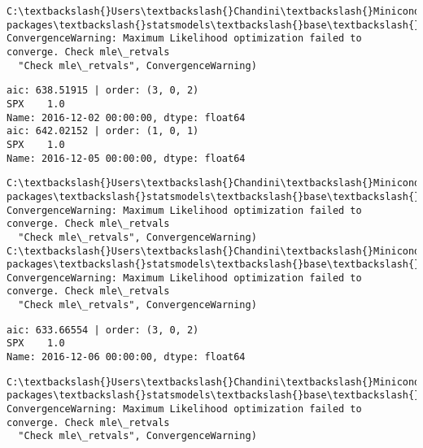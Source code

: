\documentclass[11pt]{article}
\begin{document}
    \begin{Verbatim}[commandchars=\\\{\}]
C:\textbackslash{}Users\textbackslash{}Chandini\textbackslash{}Miniconda3\textbackslash{}envs\textbackslash{}auquan\textbackslash{}lib\textbackslash{}site-packages\textbackslash{}statsmodels\textbackslash{}base\textbackslash{}model.py:496: ConvergenceWarning: Maximum Likelihood optimization failed to converge. Check mle\_retvals
  "Check mle\_retvals", ConvergenceWarning)

    \end{Verbatim}

    \begin{Verbatim}[commandchars=\\\{\}]
aic: 638.51915 | order: (3, 0, 2)
SPX    1.0
Name: 2016-12-02 00:00:00, dtype: float64
aic: 642.02152 | order: (1, 0, 1)
SPX    1.0
Name: 2016-12-05 00:00:00, dtype: float64

    \end{Verbatim}

    \begin{Verbatim}[commandchars=\\\{\}]
C:\textbackslash{}Users\textbackslash{}Chandini\textbackslash{}Miniconda3\textbackslash{}envs\textbackslash{}auquan\textbackslash{}lib\textbackslash{}site-packages\textbackslash{}statsmodels\textbackslash{}base\textbackslash{}model.py:496: ConvergenceWarning: Maximum Likelihood optimization failed to converge. Check mle\_retvals
  "Check mle\_retvals", ConvergenceWarning)
C:\textbackslash{}Users\textbackslash{}Chandini\textbackslash{}Miniconda3\textbackslash{}envs\textbackslash{}auquan\textbackslash{}lib\textbackslash{}site-packages\textbackslash{}statsmodels\textbackslash{}base\textbackslash{}model.py:496: ConvergenceWarning: Maximum Likelihood optimization failed to converge. Check mle\_retvals
  "Check mle\_retvals", ConvergenceWarning)

    \end{Verbatim}

    \begin{Verbatim}[commandchars=\\\{\}]
aic: 633.66554 | order: (3, 0, 2)
SPX    1.0
Name: 2016-12-06 00:00:00, dtype: float64

    \end{Verbatim}

    \begin{Verbatim}[commandchars=\\\{\}]
C:\textbackslash{}Users\textbackslash{}Chandini\textbackslash{}Miniconda3\textbackslash{}envs\textbackslash{}auquan\textbackslash{}lib\textbackslash{}site-packages\textbackslash{}statsmodels\textbackslash{}base\textbackslash{}model.py:496: ConvergenceWarning: Maximum Likelihood optimization failed to converge. Check mle\_retvals
  "Check mle\_retvals", ConvergenceWarning)

    \end{Verbatim}
\end{document}
